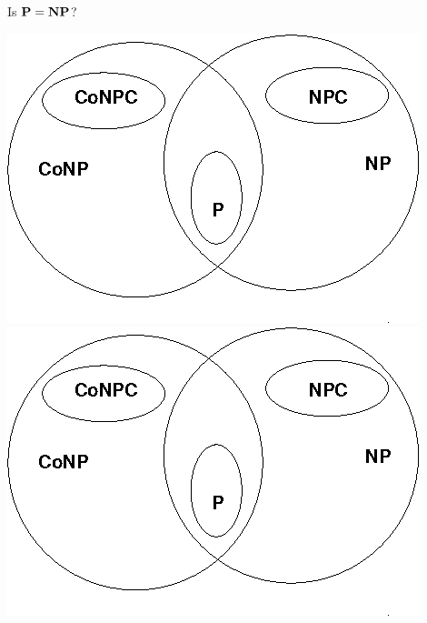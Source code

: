 \begin{openquestion}
    Is $\mathbf{P} = \mathbf{NP}$?
    \begin{multicols}{2}
        \centering
        \includegraphics[width=.4\textwidth]{figures/np-not-p.png}\hfill
        \includegraphics[width=.4\textwidth]{figures/np-not-p.png}\hfill
    \end{multicols}

\end{openquestion}
